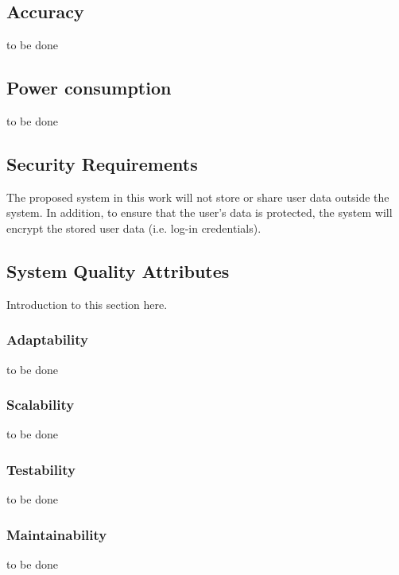     \subsection{Accuracy}
    to be done
    
    \subsection{Power consumption}
    to be done 
    
    \subsection{Security Requirements}
    The proposed system in this work will not store or share user data outside the system. In addition, to ensure that the user's data is protected, the system will encrypt the stored user data (i.e. log-in credentials). 
    
    \subsection{System Quality Attributes}
    Introduction to this section here.
        \subsubsection{Adaptability}
        to be done
        \subsubsection{Scalability}
        to be done
        \subsubsection{Testability}
        to be done
        \subsubsection{Maintainability}
        to be done
    
    
    